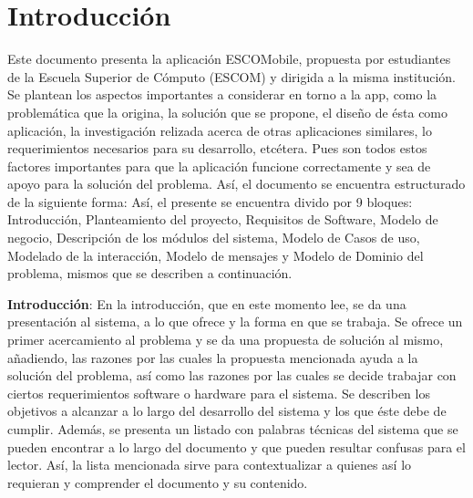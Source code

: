 \section{Introducción}

\noindent
Este documento presenta la aplicación ESCOMobile, propuesta por estudiantes de la Escuela Superior de Cómputo (ESCOM) y dirigida a la misma institución. Se plantean los aspectos importantes a considerar en torno a la app, como la problemática que la origina, la solución que se propone, el diseño de ésta como aplicación, la investigación relizada acerca de otras aplicaciones similares, lo requerimientos necesarios para su desarrollo, etcétera. Pues son todos estos factores importantes para que la aplicación funcione correctamente y sea de apoyo para la solución del problema. Así, el documento se encuentra estructurado de la siguiente forma:
\newline
Así, el presente se encuentra divido por 9 bloques: Introducción, Planteamiento del proyecto, Requisitos de Software, Modelo de negocio, Descripción de los módulos del sistema, Modelo de Casos de uso, Modelado de la interacción, Modelo de mensajes y Modelo de Dominio del problema, mismos que se describen a continuación. 
\newline

\noindent
\textbf{Introducción}: En la introducción, que en este momento lee, se da una presentación al sistema, a lo que ofrece y la forma en que se trabaja. Se ofrece un primer acercamiento al problema y se da una propuesta de solución al mismo, añadiendo, las razones por las cuales la propuesta mencionada ayuda a la solución del problema, así como las razones por las cuales se decide trabajar con ciertos requerimientos software o hardware para el sistema. Se describen los objetivos a alcanzar a lo largo del desarrollo del sistema y los que éste debe de cumplir. Además, se presenta un listado con palabras técnicas del sistema que se pueden encontrar a lo largo del documento y que pueden resultar confusas para el lector. Así, la lista mencionada sirve para contextualizar a quienes así lo requieran y comprender el documento y su contenido. 
\newline

